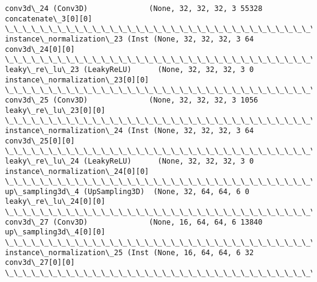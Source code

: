 \documentclass[11pt]{article}
\begin{document}
\begin{Verbatim}[commandchars=\\\{\}]
conv3d\_24 (Conv3D)              (None, 32, 32, 32, 3 55328       concatenate\_3[0][0]              
\_\_\_\_\_\_\_\_\_\_\_\_\_\_\_\_\_\_\_\_\_\_\_\_\_\_\_\_\_\_\_\_\_\_\_\_\_\_\_\_\_\_\_\_\_\_\_\_\_\_\_\_\_\_\_\_\_\_\_\_\_\_\_\_\_\_\_\_\_\_\_\_\_\_\_\_\_\_\_\_\_\_\_\_\_\_\_\_\_\_\_\_\_\_\_\_\_\_
instance\_normalization\_23 (Inst (None, 32, 32, 32, 3 64          conv3d\_24[0][0]                  
\_\_\_\_\_\_\_\_\_\_\_\_\_\_\_\_\_\_\_\_\_\_\_\_\_\_\_\_\_\_\_\_\_\_\_\_\_\_\_\_\_\_\_\_\_\_\_\_\_\_\_\_\_\_\_\_\_\_\_\_\_\_\_\_\_\_\_\_\_\_\_\_\_\_\_\_\_\_\_\_\_\_\_\_\_\_\_\_\_\_\_\_\_\_\_\_\_\_
leaky\_re\_lu\_23 (LeakyReLU)      (None, 32, 32, 32, 3 0           instance\_normalization\_23[0][0]  
\_\_\_\_\_\_\_\_\_\_\_\_\_\_\_\_\_\_\_\_\_\_\_\_\_\_\_\_\_\_\_\_\_\_\_\_\_\_\_\_\_\_\_\_\_\_\_\_\_\_\_\_\_\_\_\_\_\_\_\_\_\_\_\_\_\_\_\_\_\_\_\_\_\_\_\_\_\_\_\_\_\_\_\_\_\_\_\_\_\_\_\_\_\_\_\_\_\_
conv3d\_25 (Conv3D)              (None, 32, 32, 32, 3 1056        leaky\_re\_lu\_23[0][0]             
\_\_\_\_\_\_\_\_\_\_\_\_\_\_\_\_\_\_\_\_\_\_\_\_\_\_\_\_\_\_\_\_\_\_\_\_\_\_\_\_\_\_\_\_\_\_\_\_\_\_\_\_\_\_\_\_\_\_\_\_\_\_\_\_\_\_\_\_\_\_\_\_\_\_\_\_\_\_\_\_\_\_\_\_\_\_\_\_\_\_\_\_\_\_\_\_\_\_
instance\_normalization\_24 (Inst (None, 32, 32, 32, 3 64          conv3d\_25[0][0]                  
\_\_\_\_\_\_\_\_\_\_\_\_\_\_\_\_\_\_\_\_\_\_\_\_\_\_\_\_\_\_\_\_\_\_\_\_\_\_\_\_\_\_\_\_\_\_\_\_\_\_\_\_\_\_\_\_\_\_\_\_\_\_\_\_\_\_\_\_\_\_\_\_\_\_\_\_\_\_\_\_\_\_\_\_\_\_\_\_\_\_\_\_\_\_\_\_\_\_
leaky\_re\_lu\_24 (LeakyReLU)      (None, 32, 32, 32, 3 0           instance\_normalization\_24[0][0]  
\_\_\_\_\_\_\_\_\_\_\_\_\_\_\_\_\_\_\_\_\_\_\_\_\_\_\_\_\_\_\_\_\_\_\_\_\_\_\_\_\_\_\_\_\_\_\_\_\_\_\_\_\_\_\_\_\_\_\_\_\_\_\_\_\_\_\_\_\_\_\_\_\_\_\_\_\_\_\_\_\_\_\_\_\_\_\_\_\_\_\_\_\_\_\_\_\_\_
up\_sampling3d\_4 (UpSampling3D)  (None, 32, 64, 64, 6 0           leaky\_re\_lu\_24[0][0]             
\_\_\_\_\_\_\_\_\_\_\_\_\_\_\_\_\_\_\_\_\_\_\_\_\_\_\_\_\_\_\_\_\_\_\_\_\_\_\_\_\_\_\_\_\_\_\_\_\_\_\_\_\_\_\_\_\_\_\_\_\_\_\_\_\_\_\_\_\_\_\_\_\_\_\_\_\_\_\_\_\_\_\_\_\_\_\_\_\_\_\_\_\_\_\_\_\_\_
conv3d\_27 (Conv3D)              (None, 16, 64, 64, 6 13840       up\_sampling3d\_4[0][0]            
\_\_\_\_\_\_\_\_\_\_\_\_\_\_\_\_\_\_\_\_\_\_\_\_\_\_\_\_\_\_\_\_\_\_\_\_\_\_\_\_\_\_\_\_\_\_\_\_\_\_\_\_\_\_\_\_\_\_\_\_\_\_\_\_\_\_\_\_\_\_\_\_\_\_\_\_\_\_\_\_\_\_\_\_\_\_\_\_\_\_\_\_\_\_\_\_\_\_
instance\_normalization\_25 (Inst (None, 16, 64, 64, 6 32          conv3d\_27[0][0]                  
\_\_\_\_\_\_\_\_\_\_\_\_\_\_\_\_\_\_\_\_\_\_\_\_\_\_\_\_\_\_\_\_\_\_\_\_\_\_\_\_\_\_\_\_\_\_\_\_\_\_\_\_\_\_\_\_\_\_\_\_\_\_\_\_\_\_\_\_\_\_\_\_\_\_\_\_\_\_\_\_\_\_\_\_\_\_\_\_\_\_\_\_\_\_\_\_\_\_

\end{Verbatim}
\end{document}
